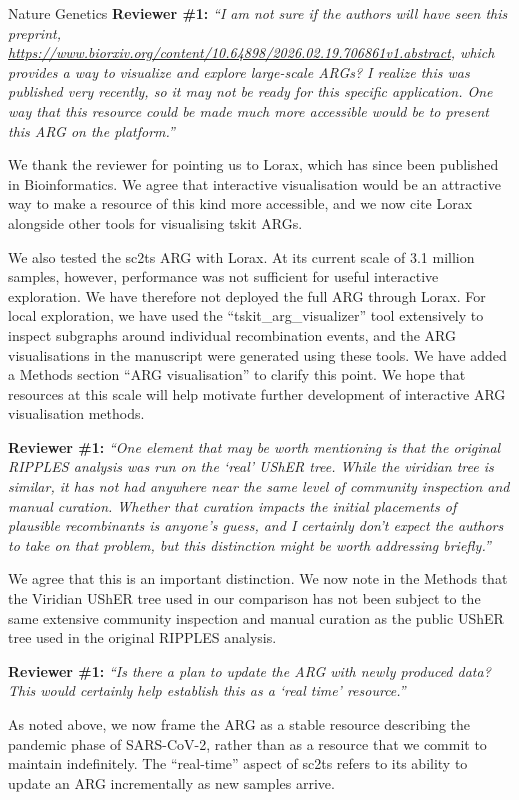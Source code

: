 \documentclass{letter}
\begin{document}
\begin{letter}{Nature Genetics}
\noindent \textbf{Reviewer \#1:} \textit{``I am not sure if the authors will have seen
this preprint,
\url{https://www.biorxiv.org/content/10.64898/2026.02.19.706861v1.abstract},
which provides a way to visualize and explore large-scale ARGs? I realize this
was published very recently, so it may not be ready for this specific
application. One way that this resource could be made much more accessible
would be to present this ARG on the platform.''}

We thank the reviewer for pointing us to Lorax, which has since been published
in Bioinformatics. We agree that interactive visualisation would be an
attractive way to make a resource of this kind more accessible, and we now cite
Lorax alongside other tools for visualising tskit ARGs.

We also tested the sc2ts ARG with Lorax. At its current scale of 3.1 million
samples, however, performance was not sufficient for useful interactive
exploration. We have therefore not deployed the full ARG through Lorax. For
local exploration, we have used the ``tskit\_arg\_visualizer'' tool extensively to
inspect subgraphs around individual recombination events, and the ARG
visualisations in the manuscript were generated using these tools.
We have added a Methods section ``ARG visualisation'' to clarify this point.
We hope that resources at this scale will help motivate further development of interactive
ARG visualisation methods.

\noindent \textbf{Reviewer \#1:} \textit{``One element that may be worth mentioning is
that the original RIPPLES analysis was run on the `real' UShER tree. While the
viridian tree is similar, it has not had anywhere near the same level of
community inspection and manual curation. Whether that curation impacts the
initial placements of plausible recombinants is anyone's guess, and I
certainly don't expect the authors to take on that problem, but this
distinction might be worth addressing briefly.''}

We agree that this is an important distinction. We now note in the Methods that
the Viridian UShER tree used in our comparison has not been subject to the same
extensive community inspection and manual curation as the public UShER tree
used in the original RIPPLES analysis.

\noindent \textbf{Reviewer \#1:} \textit{``Is there a plan to update the ARG with newly
produced data? This would certainly help establish this as a `real time'
resource.''}

As noted above, we now frame the ARG as a stable resource describing the
pandemic phase of SARS-CoV-2, rather than as a resource that we commit to
maintain indefinitely. The ``real-time'' aspect of sc2ts refers to its ability to
update an ARG incrementally as new samples arrive.


\end{letter}
\end{document}
